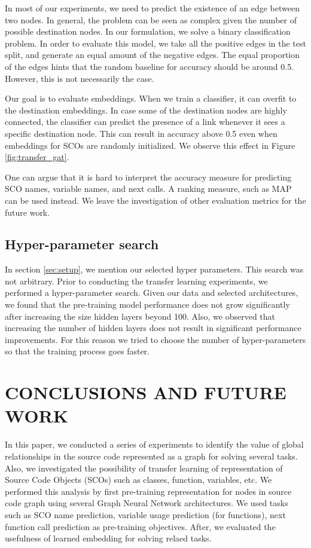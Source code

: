 \documentclass[a4paper,twoside]{article}
\begin{document}
In most of our experiments, we need to predict the existence of an edge between two nodes. In general, the problem can be seen as complex given the number of possible destination nodes. In our formulation, we solve a binary classification problem. In order to evaluate this model, we take all the positive edges in the test split, and generate an equal amount of the negative edges. The equal proportion of the edges hints that the random baseline for accuracy should be around 0.5. However, this is not necessarily the case. 

Our goal is to evaluate embeddings. When we train a classifier, it can overfit to the destination embeddings. In case some of the destination nodes are highly connected, the classifier can predict the presence of a link whenever it sees a specific destination node. This can result in accuracy above 0.5 even when embeddings for SCOs are randomly initialized. We observe this effect in Figure \ref{fig:transfer_gat}. 

One can argue that it is hard to interpret the accuracy measure for predicting SCO names, variable names, and next calls. A ranking measure, such as MAP can be used instead. We leave the investigation of other evaluation metrics for the future work.

\subsection{Hyper-parameter search}

In section \ref{sec:setup}, we mention our selected hyper parameters. This search was not arbitrary. Prior to conducting the transfer learning experiments, we performed a hyper-parameter search. Given our data and selected architectures, we found that the pre-training model performance does not grow significantly after increasing the size hidden layers beyond 100. Also, we observed that increasing the number of hidden layers does not result in significant performance improvements. For this reason we tried to choose the number of hyper-parameters so that the training process goes faster. 

\section{\uppercase{Conclusions and Future Work}}\label{sec:conclusion}

In this paper, we conducted a series of experiments to identify the value of global relationships in the source code represented as a graph for solving several tasks. Also, we investigated the possibility of transfer learning of representation of Source Code Objects (SCOs) such as classes, function, variables, etc. We performed this analysis by first pre-training representation for nodes in source code graph using several Graph Neural Network architectures. We used tasks such as SCO name prediction, variable usage prediction (for functions), next function call prediction as pre-training objectives. After, we evaluated the usefulness of learned embedding for solving relaed tasks. 
\end{document}
